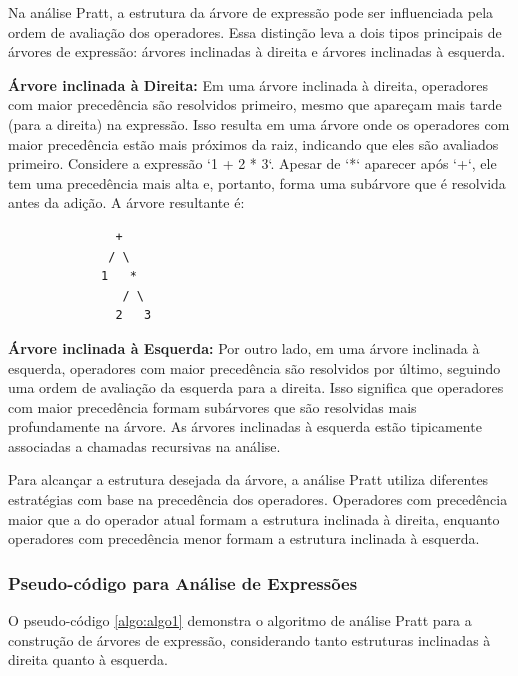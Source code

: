 \documentclass[english, 
               brazil, 
               bsc] %
               {dcomp-abntex2}
\begin{document}
Na análise Pratt, a estrutura da árvore de expressão pode ser influenciada pela ordem de avaliação dos operadores. Essa distinção leva a dois tipos principais de árvores de expressão: árvores inclinadas à direita e árvores inclinadas à esquerda.

\textbf{Árvore inclinada à Direita:} Em uma árvore inclinada à direita, operadores com maior precedência são resolvidos primeiro, mesmo que apareçam mais tarde (para a direita) na expressão. Isso resulta em uma árvore onde os operadores com maior precedência estão mais próximos da raiz, indicando que eles são avaliados primeiro. Considere a expressão `1 + 2 * 3`. Apesar de `*` aparecer após `+`, ele tem uma precedência mais alta e, portanto, forma uma subárvore que é resolvida antes da adição. A árvore resultante é:


\begin{verbatim}
               +
              / \
             1   *
                / \
               2   3
\end{verbatim}

\textbf{Árvore inclinada à Esquerda:} Por outro lado, em uma árvore inclinada à esquerda, operadores com maior precedência são resolvidos por último, seguindo uma ordem de avaliação da esquerda para a direita. Isso significa que operadores com maior precedência formam subárvores que são resolvidas mais profundamente na árvore. As árvores inclinadas à esquerda estão tipicamente associadas a chamadas recursivas na análise.

Para alcançar a estrutura desejada da árvore, a análise Pratt utiliza diferentes estratégias com base na precedência dos operadores. Operadores com precedência maior que a do operador atual formam a estrutura inclinada à direita, enquanto operadores com precedência menor formam a estrutura inclinada à esquerda.

\subsubsection{Pseudo-código para Análise de Expressões}

O pseudo-código \ref{algo:algo1}
demonstra o algoritmo de análise Pratt para a construção de árvores de expressão, considerando tanto estruturas inclinadas à direita quanto à esquerda.

%
\end{document}
